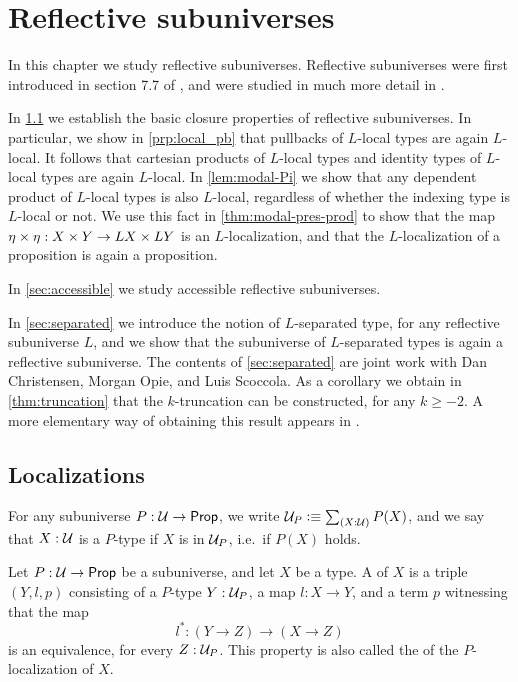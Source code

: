 \chapter{Reflective subuniverses}\label{chap:reflective}

In this chapter we study reflective subuniverses. Reflective subuniverses were first introduced in section 7.7 of \cite{hottbook}, and were studied in much more detail in \cite{RijkeShulmanSpitters}. 

In \cref{sec:prop-rfsu} we establish the basic closure properties of reflective subuniverses. In particular, we show in \cref{prp:local_pb} that pullbacks of $L$-local types are again $L$-local. It follows that cartesian products of $L$-local types and identity types of $L$-local types are again $L$-local. In \cref{lem:modal-Pi} we show that any dependent product of $L$-local types is also $L$-local, regardless of whether the indexing type is $L$-local or not. We use this fact in \cref{thm:modal-pres-prod} to show that the map ${\eta_{}}\times{\eta_{}}:X\times Y\to LX\times LY$ is an $L$-localization, and that the $L$-localization of a proposition is again a proposition.

In \cref{sec:accessible} we study accessible reflective subuniverses.

In \cref{sec:separated} we introduce the notion of $L$-separated type, for any reflective subuniverse $L$, and we show that the subuniverse of $L$-separated types is again a reflective subuniverse. The contents of \cref{sec:separated} are joint work with Dan Christensen, Morgan Opie, and Luis Scoccola. As a corollary we obtain in \cref{thm:truncation} that the $k$-truncation can be constructed, for any $k\geq -2$. A more elementary way of obtaining this result appears in \cite{joinconstruction}.

\section{Localizations}
\label{sec:prop-rfsu}

For any subuniverse $P:\mathcal{U}\to\mathsf{Prop}$, we write $\UU_P\defeq \sm{X:\UU}P(X)$, and we say that $X:\mathcal{U}$ is a $P$-type if $X$ is in $\mathcal{U}_P$, i.e.~if $P(X)$ holds.

\begin{defn}
Let $P:\mathcal{U}\to\mathsf{Prop}$ be a subuniverse, and let $X$ be a type. A  of $X$ is a triple $(Y,l,p)$ consisting of a $P$-type $Y:\mathcal{U}_P$, a map $l:X\to Y$, and a term $p$ witnessing that the map
\begin{equation*}
l^\ast : (Y\to Z)\to (X\to Z)
\end{equation*}
is an equivalence, for every $Z:\mathcal{U}_P$. This property is also called the  of the $P$-localization of $X$.
\end{defn}

